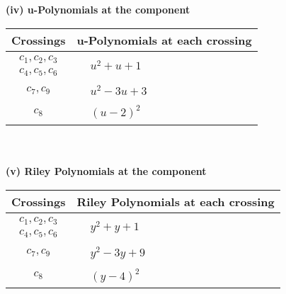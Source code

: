 \documentclass[1p]{elsarticle_modified}
\theoremstyle{definition}
\begin{document}
\newpage\renewcommand{\arraystretch}{1}
\flushleft \textbf{(iv) u-Polynomials at the component}\newline \\
\begin{tabular}{m{50pt}|m{274pt}}
Crossings & \hspace{64pt}u-Polynomials at each crossing \\
\hline $$\begin{aligned}c_{1},c_{2},c_{3}\\c_{4},c_{5},c_{6}\end{aligned}$$&$\begin{aligned}
&u^2+u+1
\end{aligned}$\\
\hline $$\begin{aligned}c_{7},c_{9}\end{aligned}$$&$\begin{aligned}
&u^2-3 u+3
\end{aligned}$\\
\hline $$\begin{aligned}c_{8}\end{aligned}$$&$\begin{aligned}
&(u-2)^2
\end{aligned}$\\
\hline
\end{tabular}\\~\\
\newpage\renewcommand{\arraystretch}{1}
\flushleft \textbf{(v) Riley Polynomials at the component}\newline \\
\begin{tabular}{m{50pt}|m{274pt}}
Crossings & \hspace{64pt}Riley Polynomials at each crossing \\
\hline $$\begin{aligned}c_{1},c_{2},c_{3}\\c_{4},c_{5},c_{6}\end{aligned}$$&$\begin{aligned}
&y^2+y+1
\end{aligned}$\\
\hline $$\begin{aligned}c_{7},c_{9}\end{aligned}$$&$\begin{aligned}
&y^2-3 y+9
\end{aligned}$\\
\hline $$\begin{aligned}c_{8}\end{aligned}$$&$\begin{aligned}
&(y-4)^2
\end{aligned}$\\
\hline
\end{tabular}\\~\\
\end{document}
